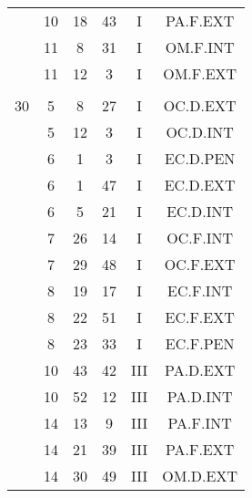 \documentclass[12pt, a4paper]{article}
\begin{document}
\begin{multicols}{3}
{\begin{tabular}{c c c c c c}
	 	 	 	 & 10 & 18 & 43 & I & PA.F.EXT\\%
	 	 	 	 & 11 & 8 & 31 & I & OM.F.INT\\%
	 	 	 	 & 11 & 12 & 3 & I & OM.F.EXT\\%
	 	 	 	 & & & & & \\%
	 	 	 	30 & 5 & 8 & 27 & I & OC.D.EXT\\%
	 	 	 	 & 5 & 12 & 3 & I & OC.D.INT\\%
	 	 	 	 & 6 & 1 & 3 & I & EC.D.PEN\\%
	 	 	 	 & 6 & 1 & 47 & I & EC.D.EXT\\%
	 	 	 	 & 6 & 5 & 21 & I & EC.D.INT\\%
	 	 	 	 & 7 & 26 & 14 & I & OC.F.INT\\%
	 	 	 	 & 7 & 29 & 48 & I & OC.F.EXT\\%
	 	 	 	 & 8 & 19 & 17 & I & EC.F.INT\\%
	 	 	 	 & 8 & 22 & 51 & I & EC.F.EXT\\%
	 	 	 	 & 8 & 23 & 33 & I & EC.F.PEN\\%
	 	 	 	 & 10 & 43 & 42 & III & PA.D.EXT\\%
	 	 	 	 & 10 & 52 & 12 & III & PA.D.INT\\%
	 	 	 	 & 14 & 13 & 9 & III & PA.F.INT\\%
	 	 	 	 & 14 & 21 & 39 & III & PA.F.EXT\\%
	 	 	 	 & 14 & 30 & 49 & III & OM.D.EXT\\%
	 	 \end{tabular}
 	}
\end{multicols}
\end{document}
